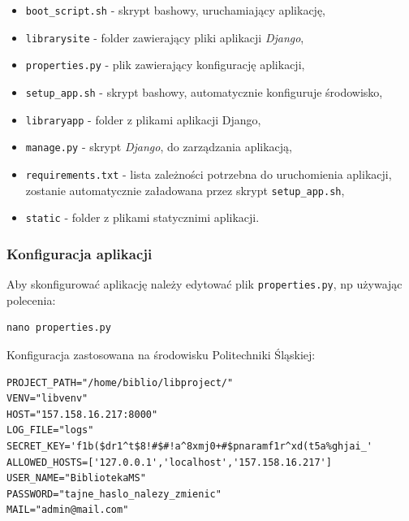 \documentclass[twoside]{projektInzynierskiMS}
\begin{document}
\begin{itemize}
	\item \verb`boot_script.sh` - skrypt bashowy, uruchamiający aplikację,
	\item \verb`librarysite` - folder zawierający pliki aplikacji \textit{Django},
	\item \verb`properties.py` - plik zawierający konfigurację aplikacji,
	\item \verb`setup_app.sh` - skrypt bashowy, automatycznie konfiguruje środowisko,
	\item \verb`libraryapp` - folder z plikami aplikacji Django,
	\item \verb`manage.py` - skrypt \textit{Django}, do zarządzania aplikacją,
	\item \verb`requirements.txt` - lista zależności potrzebna do uruchomienia aplikacji, zostanie automatycznie załadowana przez skrypt \verb`setup_app.sh`,
	\item \verb`static` - folder z plikami statycznimi aplikacji.
\end{itemize}



\subsubsection{Konfiguracja aplikacji}

Aby skonfigurować aplikację należy edytować plik \verb`properties.py`, np używając polecenia:
\begin{verbatim}
nano properties.py
\end{verbatim}

Konfiguracja zastosowana na środowisku Politechniki Śląskiej:
\begin{verbatim}
PROJECT_PATH="/home/biblio/libproject/"
VENV="libvenv"
HOST="157.158.16.217:8000"
LOG_FILE="logs"
SECRET_KEY='f1b($dr1^t$8!#$#!a^8xmj0+#$pnaramf1r^xd(t5a%ghjai_'
ALLOWED_HOSTS=['127.0.0.1','localhost','157.158.16.217']
USER_NAME="BibliotekaMS"
PASSWORD="tajne_haslo_nalezy_zmienic"
MAIL="admin@mail.com"
\end{verbatim}
\end{document}
